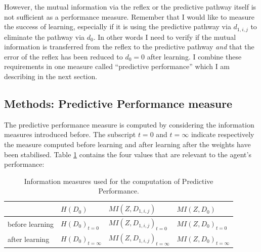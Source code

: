 However, the mutual information via the reflex or the predictive
pathway itself is not sufficient as a performance measure. Remember
that I would like to measure the success of learning, especially if it
is using the predictive
pathway via $d_{1,i,j}$ to eliminate the pathway via $d_0$.
In other words I need to verify if the mutual information is
transferred from the reflex to the predictive pathway \textsl{and}
that the error of the reflex has been reduced to $d_0=0$ after learning. 
I combine these requirements in one measure called 
``predictive performance'' which I am describing in the
next section.


\subsection{Methods: Predictive Performance measure}
The predictive performance measure is computed by considering the
information measures introduced before. The subscript $t=0$ and $t=\infty$ indicate
respectively the measure computed before learning and after learning after the weights 
have been stabilised.
Table \ref{table:PPmeausure:Values} contains the four values that are relevant
to the agent's performance:

\begin{table}[htbp]
\caption[Information values for the \textbf{PP} computation]
{Information measures used for the computation of Predictive Performance. \label{table:PPmeausure:Values}}
\begin{center}
  \begin{tabular}{| l | l | l | l |}
    \hline
		    & $H(D_0)$ & $MI(Z,D_{1,i,j})$ & $MI(Z,D_0)$\\ 
    \hline
    before learning & $H(D_0)_{t=0}$ & $MI(Z,D_{1,i,j})_{t=0}$ & $MI(Z,D_0)_{t=0}$ \\ 
    \hline
    after learning &  $H(D_0)_{t=\infty}$& $MI(Z,D_{1,i,j})_{t=\infty}$ & $MI(Z,D_0)_{t=\infty}$ \\ 
    \hline
  \end{tabular}
\end{center}
\end{table}

